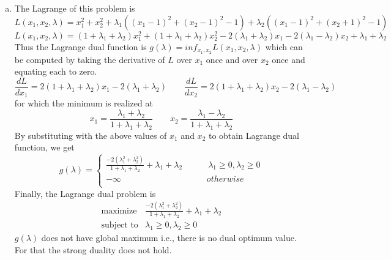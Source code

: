 \documentclass[12pt] {article}
\begin{document}
\begin{enumerate}[(a)]
\item 
The Lagrange of this problem is 
$$
L(x_{1},x_{2}, \lambda) = x_{1}^{2} + x_{2}^{2} + \lambda_{1}\left((x_{1}-1)^{2}+ (x_{2}-1)^{2}-1\right) + \lambda_{2}\left((x_{1}-1)^{2}+ (x_{2}+1)^{2}-1\right)
$$
$$
L(x_{1},x_{2}, \lambda) = (1+\lambda_{1}+\lambda_{2})x_{1}^{2} +  (1+\lambda_{1}+\lambda_{2})x_{2}^{2} -2(\lambda_{1}+\lambda_{2})x_{1} -2 (\lambda_{1}-\lambda_{2})x_{2}+\lambda_{1}+\lambda_{2}
$$
Thus the Lagrange dual function is $g(\lambda) = inf_{x_1,x_2} L(x_{1},x_{2},\lambda)$ which can be computed by taking the derivative of $L$ over $x_{1}$ once and over $x_{2}$ once and equating each to zero. 
$$
\frac{dL}{dx_{1}} = 2(1+\lambda_{1}+\lambda_{2})x_{1} - 2(\lambda_{1}+\lambda_{2}) \quad \quad \frac{dL}{dx_{2}} = 2(1+\lambda_{1}+\lambda_{2})x_{2} - 2(\lambda_{1}-\lambda_{2})
$$
for which the minimum is realized at 
$$
x_{1} = \frac{\lambda_{1}+\lambda_{2}}{1+\lambda_{1}+\lambda_{2}} \quad \quad x_{2} = \frac{\lambda_{1}-\lambda_{2}}{1+\lambda_{1}+\lambda_{2}}
$$
By substituting with the above values of $x_{1}$ and $x_{2}$ to obtain Lagrange dual function, we get 
$$
g(\lambda) =
\begin{cases}
   \frac{-2(\lambda_{1}^{2} + \lambda_{2}^{2}) }{1+\lambda_{1}+\lambda_{2}} + \lambda_{1} + \lambda_{2} \qquad \quad \lambda_{1} \geq 0,\lambda_{2} \geq 0 \\    
   -\infty            \quad \quad \quad \qquad \quad \quad \quad \quad \quad otherwise \\    
\end{cases}
$$
Finally, the Lagrange dual problem is 
\[
\begin{array}{cl}
\text{maximize} & \frac{-2(\lambda_{1}^{2} + \lambda_{2}^{2}) }{1+\lambda_{1}+\lambda_{2}} + \lambda_{1} + \lambda_{2}\\
\text{subject to} & \lambda_{1} \geq 0, \lambda_{2} \geq 0
\end{array} 
\]
$g(\lambda)$ does not have global maximum i.e., there is no dual optimum value. For that the strong duality does not hold. 
\end{enumerate}



\end{document}
